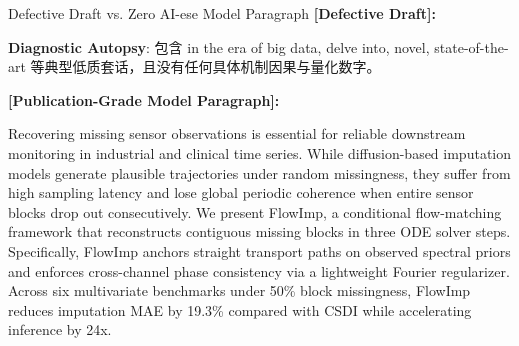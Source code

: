 \begin{ExampleBox}{Defective Draft vs. Zero AI-ese Model Paragraph}
\textbf{\color{TargetHighlight}[Defective Draft]:}\par
{}\par\vspace{4pt}
\textbf{Diagnostic Autopsy}: 包含 in the era of big data, delve into, novel, state-of-the-art 等典型低质套话，且没有任何具体机制因果与量化数字。\par\vspace{6pt}
\textbf{\color{AcadNavy}[Publication-Grade Model Paragraph]:}\par
Recovering missing sensor observations is essential for reliable downstream monitoring in industrial and clinical time series. While diffusion-based imputation models generate plausible trajectories under random missingness, they suffer from high sampling latency and lose global periodic coherence when entire sensor blocks drop out consecutively. We present FlowImp, a conditional flow-matching framework that reconstructs contiguous missing blocks in three ODE solver steps. Specifically, FlowImp anchors straight transport paths on observed spectral priors and enforces cross-channel phase consistency via a lightweight Fourier regularizer. Across six multivariate benchmarks under 50\% block missingness, FlowImp reduces imputation MAE by 19.3\% compared with CSDI while accelerating inference by 24x.
\end{ExampleBox}
